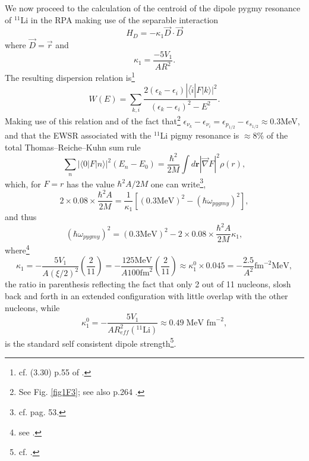 We now proceed to the calculation of the centroid of the dipole pygmy resonance of $^{11}$Li in the RPA making use of the separable interaction
 \begin{equation}\label{eq2.F.6}
H_D=-\kappa_1\vec D\cdot\vec D
 \end{equation}
where $\vec D=\vec r$ and
 \begin{equation}
\kappa_1=\frac{-5V_1}{AR^2}.
 \end{equation}
The resulting dispersion relation is\footnote{cf. (3.30) p.55 of \cite{Bortignon:98}.}
\begin{equation}
W(E)=\sum_{k,i}\frac{2(\epsilon_k-\epsilon_i)|\langle \tilde i|F|k\rangle|^2}{(\epsilon_k-\epsilon_i)^2-E^2}.
\end{equation}
 Making use of this relation and of the fact that\footnote{See Fig. \ref{fig1F3}; see also  p.264 \cite{Brink:05}.} 
 $\epsilon_{\nu_k}-\epsilon_{\nu_i}=\epsilon_{p_{1/2}}-\epsilon_{s_{1/2}}\approx 0.3 $MeV, and that the EWSR associated with the $^{11}$Li pigmy resonance is $\approx 8$\% of the total Thomas--Reiche--Kuhn sum rule
 \begin{equation}
\sum_n |\langle0|F|n\rangle|^2(E_n-E_0)=\frac{\hbar^2}{2M}\int d\mathbf r |\vec\nabla F|^2 \rho(r),
 \end{equation}
 which, for $F=r$ has the value $\hbar^2 A/2M$ one can write\footnote{cf. \cite{Bertsch:05} pag. 53.}, 
\begin{equation*}
2\times 0.08\times \frac{\hbar^2A}{2M}=\frac{1}{\kappa_1}[(0.3\text{MeV})^2-(\hbar \omega_{pygmy})^2],
\end{equation*}
 and thus
\begin{equation*}
 (\hbar\omega_{pygmy})^2=(0.3 \text{MeV})^2-2\times 0.08\times\frac{\hbar^2A}{2M}\kappa_1,
\end{equation*}
 where\footnote{see \cite{Bortignon:98}.}
\begin{equation*}
\kappa_1=-\frac{5V_1}{A(\xi/2)^2}\left(\frac{2}{11}\right)=-\frac{125\text{MeV}}{A 100 \text{fm}^2}\left(\frac{2}{11}\right)\approx \kappa_1^0\times 0.045= -\frac{2.5}{A^2}\text{fm}^{-2}\text{MeV},
\end{equation*}
the ratio in parenthesis reflecting the fact that only 2 out of 11 nucleons, slosh back and forth in an extended configuration with little overlap with the other nucleons, while
\begin{equation}
\kappa_1^0=-\frac{5V_1}{AR^2_{eff}(^{11}\text{Li})}\approx 0.49\; \text{MeV fm}^{-2},
\end{equation}
is the standard self consistent dipole strength\footnote{cf. \cite{Bohr:75}.}.
